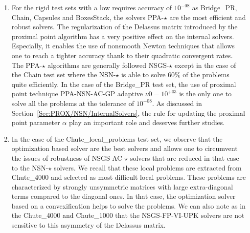 \begin{enumerate}
\item For the rigid test sets with a low requires accuracy of $10^{-08}$ as Bridge\_PR, Chain, Capsules and BoxesStack, the solvers {\sf PPA-$\star$} are the most efficient and robust solvers. The regularization of the Delassus matrix  introduced by the proximal point algorithm has a very positive effect on the internal solvers. Especially, it enables the use of nonsmooth Newton techniques that allows one to reach a tighter accuracy thank to their quadratic convergent rates. The {\sf PPA-$\star$} algorithms are generally followed {\sf NSGS-$\star$} except in the case of the Chain test set where the  {\sf NSN-$\star$} is able to solve 60\% of the problems quite efficiently. In the case of the Bridge\_PR test set, the use of proximal point technique {\sf PPA-NSN-AC-GP adaptive $\nu0 = 10^{+03}$} is the only one  to solve all the problems at the tolerance of  $10^{-08}$. As discussed in Section~\ref{Sec:PROX/NSN/InternalSolvers}, the rule for updating the proximal point parameter $\alpha$ play an important role and deserves further studies.
  
\item In the case of the Chute\_local\_problems test set, we observe that the optimization based solver are the best solvers and allows one to circumvent the issues of robustness of {\sf NSGS-AC-$\star$} solvers that are reduced in that case to the {\sf NSN-$\star$} solvers. We recall that these local problems are extracted from Chute\_4000 and selected as most difficult local problems. These problems are characterized by strongly unsymmetric matrices with large extra-diagonal terms compared to the diagonal ones. In that case, the optimization solver based on a convexification helps to solve the problems. We can also note as in the Chute\_4000 and Chute\_1000 that  the {\sf NSGS-FP-VI-UPK} solvers are not sensitive to this asymmetry of the Delassus matrix.
 \end{enumerate}


